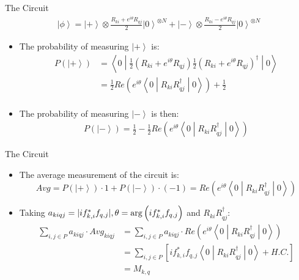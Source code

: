 \documentclass[professionalfonts]{beamer}
\newcommand{\ket}[1]{\ensuremath{\left|#1\right\rangle}}
\newcommand{\sandwich}[3]{\left< #1 \middle\vert #2 \middle\vert #3 \right>}
\newcommand{\paren}[1]{\left( #1 \right)}
\newcommand{\elec}{N}
\DeclarePairedDelimiter\abs{\lvert}{\rvert}
\begin{document}
\begin{frame}{The Circuit}
\begin{equation*}
	\begin{split}
		\ket\phi = \ket + \otimes \frac{R_{ki} + e^{i\theta}R_{qj}}{2} \ket 0^{\otimes \elec}
		 + \ket - \otimes \frac{R_{ki} - e^{i\theta}R_{qj}}{2} \ket 0^{\otimes \elec}
	\end{split}
\end{equation*}
\begin{itemize}
	\item The probability of measuring $\ket +$ is:
\begin{equation*}
	\begin{split}
		P(\ket +)
		&= \sandwich 0 {
			\frac{1}{2}\paren{R_{ki} + e^{i\theta} R_{qj}}
			\frac{1}{2}\paren{R_{ki} + e^{i\theta} R_{qj}}^{\dagger}
		} 0 \\
		&= \frac 1 2 Re\paren{e^{i\theta}\sandwich 0 {
			 R_{ki}R_{qj}^{\dagger}
			} 0 }
			+ \frac{1}{2}\\
	\end{split}
\end{equation*}
	\item The probability of measuring $\ket -$ is then:
\begin{equation*}
	\begin{split}
		P(\ket -)
		= \frac 1 2 - \frac 1 2 Re\paren{e^{i\theta}\sandwich 0 {
			 R_{ki}R_{qj}^{\dagger}
	} 0 }
	\end{split}
\end{equation*}
\end{itemize}
\end{frame}



\begin{frame}{The Circuit}
	\begin{itemize}
		\item The average measurement of the circuit is:
			$$Avg = P(\ket +) \cdot 1 + P(\ket -) \cdot (-1) = Re\paren{e^{i\theta}\sandwich 0 {R_{ki}R_{qj}^{\dagger}} 0}$$
		\item Taking $a_{kiqj} = \abs{if_{k, i}^*f_{q, j}}, \theta = \arg \paren{if_{k, i}^*f_{q, j}}$ and $R_{ki}R_{qj}^{\dagger}$:
\begin{equation*}
	\begin{split}
		\sum_{i, j \in P} a_{kiqj} \cdot Avg_{kiqj}
		&= \sum_{i, j \in P} a_{kiqj}\cdot Re\paren{e^{i\theta}\sandwich 0 {R_{ki}R_{qj}^{\dagger}} 0}\\
		&= \sum_{i, j \in P}
		\left [if_{k, i}^*f_{q, j}\sandwich 0 {R_{ki}R_{qj}^{\dagger}} 0 +
		H.C. \right ] \\ 
		&= M_{k, q} \\
	\end{split}
\end{equation*}
	\end{itemize}
\end{frame}
\end{document}
